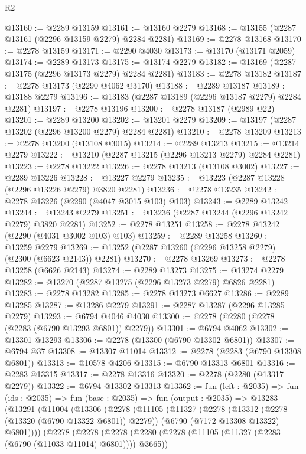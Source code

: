 \begin{lexlean}{R2}
\begin{coremodule}
@13160 := @2289 @13159
@13161 := @13160 @2279
@13168 := @13155 (@2287 @13161 (@2296 @13159 @2279) @2284 @2281)
@13169 := @2278 @13168
@13170 := @2278 @13159
@13171 := @2290 @4030
@13173 := @13170 (@13171 @2059)
@13174 := @2289 @13173
@13175 := @13174 @2279
@13182 := @13169 (@2287 @13175 (@2296 @13173 @2279) @2284 @2281)
@13183 := @2278 @13182
@13187 := @2278 @13173 (@2290 @4062 @3170)
@13188 := @2289 @13187
@13189 := @13188 @2279
@13196 := @13183 (@2287 @13189 (@2296 @13187 @2279) @2284 @2281)
@13197 := @2278 @13196
@13200 := @2278 @13187 (@2989 @22)
@13201 := @2289 @13200
@13202 := @13201 @2279
@13209 := @13197 (@2287 @13202 (@2296 @13200 @2279) @2284 @2281)
@13210 := @2278 @13209
@13213 := @2278 @13200 (@13108 @3015)
@13214 := @2289 @13213
@13215 := @13214 @2279
@13222 := @13210 (@2287 @13215 (@2296 @13213 @2279) @2284 @2281)
@13223 := @2278 @13222
@13226 := @2278 @13213 (@13108 @3002)
@13227 := @2289 @13226
@13228 := @13227 @2279
@13235 := @13223 (@2287 @13228 (@2296 @13226 @2279) @3820 @2281)
@13236 := @2278 @13235
@13242 := @2278 @13226 (@2290 (@4047 @3015 @103) @103)
@13243 := @2289 @13242
@13244 := @13243 @2279
@13251 := @13236 (@2287 @13244 (@2296 @13242 @2279) @3820 @2281)
@13252 := @2278 @13251
@13258 := @2278 @13242 (@2290 (@4031 @3002 @103) @103)
@13259 := @2289 @13258
@13260 := @13259 @2279
@13269 := @13252 (@2287 @13260 (@2296 @13258 @2279) (@2300 (@6623 @2143)) @2281)
@13270 := @2278 @13269
@13273 := @2278 @13258 (@6626 @2143)
@13274 := @2289 @13273
@13275 := @13274 @2279
@13282 := @13270 (@2287 @13275 (@2296 @13273 @2279) @6826 @2281)
@13283 := @2278 @13282
@13285 := @2278 @13273 @6627
@13286 := @2289 @13285
@13287 := @13286 @2279
@13291 := @2287 @13287 (@2296 @13285 @2279)
@13293 := @6794 @4046 @4030
@13300 := @2278 (@2280 (@2278 (@2283 (@6790 @13293 @6801)) @2279))
@13301 := @6794 @4062
@13302 := @13301 @13293
@13306 := @2278 (@13300 (@6790 @13302 @6801))
@13307 := @6794 @37
@13308 := @13307 @11014
@13312 := @2278 (@2283 (@6790 @13308 @6801))
@13313 := @10578 @4206
@13315 := @6790 @13313 @6801
@13316 := @2283 @13315
@13317 := @2278 @13316
@13320 := @2278 (@2280 (@13317 @2279))
@13322 := @6794 @13302 @13313
@13362 := fun (left : @2035) =>
  fun (ids : @2035) =>
  fun (base : @2035) =>
  fun (output : @2035) =>
  @13283
    (@13291
      (@11004
        (@13306
          (@2278
            (@11105
              (@11327
                (@2278
                  (@13312 (@2278 (@13320 (@6790 @13322 @6801)) @2279))
                  (@6790 (@7172 @13308 @13322) @6801))))
            (@2278
              (@2278
                (@2278
                  (@2280 (@2278 (@11105 (@11327 (@2283 (@6790 (@11033 @11014) @6801)))) @3665))

\end{coremodule}
\end{lexlean}
